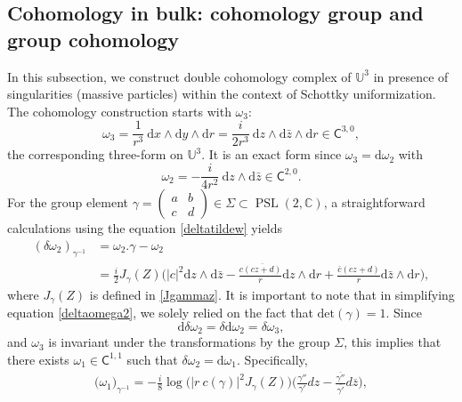 \documentclass[a4paper,11pt]{article}
\newcommand{\dd}{\mathrm{d}}
\newcommand{\PSLC}{\operatorname{PSL}(2,\mathbb{C})}
\newcommand{\compfont}[1]{\bm{\mathsf{#1}}}
\begin{document}
\subsection{Cohomology in bulk: cohomology group and group cohomology}\label{CohomologyU3}
In this subsection, we construct double cohomology complex of $\mathbb{U}^3$ in presence of singularities (massive particles) within the context of Schottky uniformization. The cohomology construction starts with $\omega_3$:
\begin{equation}
\omega_3 = \frac{1}{r^3} ~\dd x\wedge \dd y\wedge \dd r= \frac{i}{2r^3}~\dd z\wedge \dd\bar{z}\wedge\dd r \in \compfont{C}^{3,0},
\end{equation}
the corresponding three-form on $\mathbb{U}^3$. It is an exact form since $\omega_3= \dd \omega_2$ with
\begin{equation}
\omega_2 = -\frac{i}{4r^2}~\dd z\wedge \dd\bar{z}\in \compfont{C}^{2,0}.\label{omega2}
\end{equation}
For the group element $\gamma = \begin{pmatrix}
a & b \\
c & d 
\end{pmatrix}\in \Sigma\subset \PSLC$, a straightforward calculations using the equation \eqref{deltatildew} yields
\begin{equation}
\begin{split}
\left(\delta\omega_2\right)_{\gamma^{-1}}&= \omega_2.\gamma-\omega_2 \\&
=\frac{i}{2} J_{\gamma}(Z)\Bigg(\left|c\right|^2 \dd z\wedge\dd\bar{z}-\frac{c\overline{(c z+d)}}{r}\dd z\wedge\dd r+\frac{\bar{c}(cz+d)}{r}\dd\bar{z}\wedge\dd r\Bigg),
\end{split}\label{deltaomega2}
\end{equation}
where $J_{\gamma}(Z)$ is defined in \eqref{Jgammaz}. It is important to note that in simplifying equation \eqref{deltaomega2}, we solely relied on the fact that $\text{det}(\gamma)=1$. Since 
\begin{equation}
\dd \delta\omega_2 =\delta \dd \omega_2 =\delta\omega_3,
\end{equation}
and $\omega_3$ is invariant under the  transformations by the group $\Sigma$, this implies that there exists $\omega_1\in \compfont{C}^{1,1}$ such that $\delta\omega_2=\dd\omega_1$. Specifically,
\begin{equation}
\begin{aligned}
\big(\omega_1\big)_{\gamma^{-1}} = -\frac{i}{8} \log \Big(
|r~c(\gamma)|^2 J_\gamma(Z)
\Big) \Big(
\frac{\gamma''}{\gamma'}dz -  \frac{\overline{\gamma''}}{\overline{\gamma'}}d\overline{z}
\Big),
\end{aligned}
\end{equation}
\end{document}
